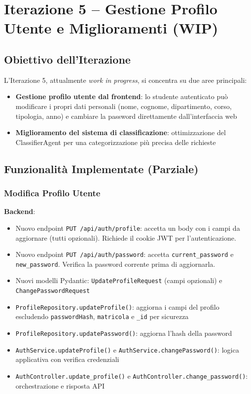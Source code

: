 \documentclass[a4paper,12pt]{report}
\begin{document}
\chapter{Iterazione 5 -- Gestione Profilo Utente e Miglioramenti (WIP)}

\section{Obiettivo dell'Iterazione}

L'Iterazione 5, attualmente \textit{work in progress}, si concentra su due aree principali:
\begin{itemize}
    \item \textbf{Gestione profilo utente dal frontend}: lo studente autenticato può modificare i propri dati personali (nome, cognome, dipartimento, corso, tipologia, anno) e cambiare la password direttamente dall'interfaccia web
    \item \textbf{Miglioramento del sistema di classificazione}: ottimizzazione del ClassifierAgent per una categorizzazione più precisa delle richieste
\end{itemize}

\section{Funzionalità Implementate (Parziale)}

\subsection{Modifica Profilo Utente}

\textbf{Backend}:
\begin{itemize}
    \item Nuovo endpoint \texttt{PUT /api/auth/profile}: accetta un body con i campi da aggiornare (tutti opzionali). Richiede il cookie JWT per l'autenticazione.
    \item Nuovo endpoint \texttt{PUT /api/auth/password}: accetta \texttt{current\_password} e \texttt{new\_password}. Verifica la password corrente prima di aggiornarla.
    \item Nuovi modelli Pydantic: \texttt{UpdateProfileRequest} (campi opzionali) e \texttt{ChangePasswordRequest}
    \item \texttt{ProfileRepository.updateProfile()}: aggiorna i campi del profilo escludendo \texttt{passwordHash}, \texttt{matricola} e \texttt{\_id} per sicurezza
    \item \texttt{ProfileRepository.updatePassword()}: aggiorna l'hash della password
    \item \texttt{AuthService.updateProfile()} e \texttt{AuthService.changePassword()}: logica applicativa con verifica credenziali
    \item \texttt{AuthController.update\_profile()} e \texttt{AuthController.change\_password()}: orchestrazione e risposta API
\end{itemize}
\end{document}
